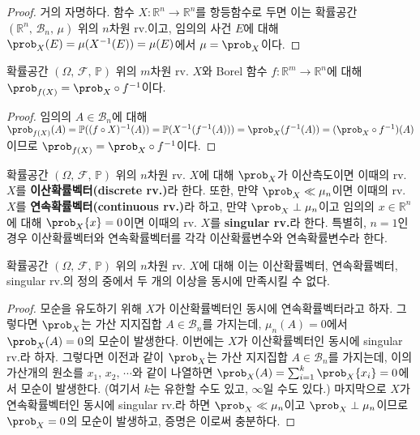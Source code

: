 \begin{proof}
    거의 자명하다. 함수 $X:\mathbb{R}^n\to\mathbb{R}^n$를 항등함수로 두면 이는 확률공간 $(\mathbb{R}^n,\,\mathcal{B}_n,\,\mu)$ 위의 $n$차원 rv.이고, 임의의 사건 $E$에 대해 $\prob_X(E)=\mu(X^{-1}(E))=\mu(E)$에서 $\mu=\prob_X$이다.
\end{proof}

\begin{theorem}
    확률공간 $(\Omega,\,\mathcal{F},\,\mathbb{P})$ 위의 $m$차원 rv. $X$와 Borel 함수 $f:\mathbb{R}^m\to\mathbb{R}^n$에 대해 $\prob_{f(X)}=\prob_X\circ f^{-1}$이다.
\end{theorem}

\begin{proof}
    임의의 $A\in\mathcal{B}_n$에 대해 $\prob_{f(X)}(A)=\mathbb{P}((f\circ X)^{-1}(A))=\mathbb{P}(X^{-1}(f^{-1}(A)))=\prob_X(f^{-1}(A))=(\prob_X\circ f^{-1})(A)$이므로 $\prob_{f(X)}=\prob_X\circ f^{-1}$이다.
\end{proof}

\begin{definition}
    확률공간 $(\Omega,\,\mathcal{F},\,\mathbb{P})$ 위의 $n$차원 rv. $X$에 대해 $\prob_X$가 이산측도이면 이때의 rv. $X$를 \textbf{이산확률벡터(discrete rv.)}라 한다. 또한, 만약 $\prob_X\ll\mu_n$이면 이때의 rv. $X$를 \textbf{연속확률벡터(continuous rv.)}라 하고, 만약 $\prob_X\perp\mu_n$이고 임의의 $x\in\mathbb{R}^n$에 대해 $\prob_X\{x\}=0$이면 이때의 rv. $X$를 \textbf{singular rv.}라 한다. 특별히, $n=1$인 경우 이산확률벡터와 연속확률벡터를 각각 이산확률변수와 연속확률변수라 한다.
\end{definition}

\begin{proposition}
    확률공간 $(\Omega,\,\mathcal{F},\,\mathbb{P})$ 위의 $n$차원 rv. $X$에 대해 이는 이산확률벡터, 연속확률벡터, singular rv.의 정의 중에서 두 개의 이상을 동시에 만족시킬 수 없다.
\end{proposition}

\begin{proof}
    모순을 유도하기 위해 $X$가 이산확률벡터인 동시에 연속확률벡터라고 하자. 그렇다면 $\prob_X$는 가산 지지집합 $A\in\mathcal{B}_n$를 가지는데, $\mu_n(A)=0$에서 $\prob_X(A)=0$의 모순이 발생한다. 이번에는 $X$가 이산확률벡터인 동시에 singular rv.라 하자. 그렇다면 이전과 같이 $\prob_X$는 가산 지지집합 $A\in\mathcal{B}_n$를 가지는데, 이의 가산개의 원소를 $x_1,\,x_2,\,\cdots$와 같이 나열하면 $\prob_X(A)=\sum_{i=1}^k\prob_X\{x_i\}=0$에서 모순이 발생한다. (여기서 $k$는 유한할 수도 있고, $\infty$일 수도 있다.) 마지막으로 $X$가 연속확률벡터인 동시에 singular rv.라 하면 $\prob_X\ll\mu_n$이고 $\prob_X\perp\mu_n$이므로 $\prob_X=0$의 모순이 발생하고, 증명은 이로써 충분하다.
\end{proof}

